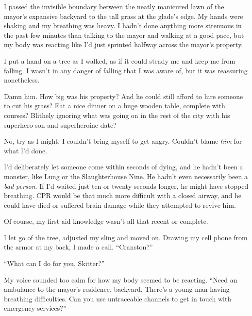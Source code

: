 





I passed the invisible boundary between the neatly manicured lawn of the mayor's expansive backyard to the tall grass at the glade's edge.  My hands were shaking and my breathing was heavy.  I hadn't done anything more strenuous in the past few minutes than talking to the mayor and walking at a good pace, but my body was reacting like I'd just sprinted halfway across the mayor's property.



I put a hand on a tree as I walked, as if it could steady me and keep me from falling.  I wasn't in any danger of falling that I was aware of, but it was reassuring nonetheless.



Damn him.  How big was his property?  And he could still afford to hire someone to cut his grass?  Eat a nice dinner on a huge wooden table, complete with courses?  Blithely ignoring what was going on in the rest of the city with his superhero son and superheroine date?



No, try as I might, I couldn't bring myself to get angry.  Couldn't blame \emph{him} for what I'd done.



I'd deliberately let someone come within seconds of dying, and he hadn't been a monster, like Lung or the Slaughterhouse Nine.  He hadn't even necessarily been a \emph{bad person}.  If I'd waited just ten or twenty seconds longer, he might have stopped breathing.  CPR would be that much more difficult with a closed airway, and he could have died or suffered brain damage while they attempted to revive him.



Of course, my first aid knowledge wasn't all that recent or complete.



I let go of the tree, adjusted my sling and moved on.  Drawing my cell phone from the armor at my back, I made a call.  ``Cranston?''



``What can I do for you, Skitter?''



My voice sounded too calm for how my body seemed to be reacting.  ``Need an ambulance to the mayor's residence, backyard.  There's a young man having breathing difficulties.  Can you use untraceable channels to get in touch with emergency services?''



